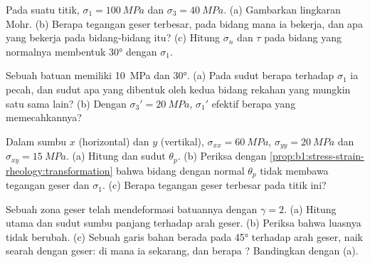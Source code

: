 \begin{exercise}[$\star$]\label{exo:b1:stress-strain-rheology:3}
Pada suatu titik, $\sigma_1 = \qty{100}{MPa}$ dan $\sigma_3 = \qty{40}{MPa}$. (a) Gambarkan lingkaran Mohr. (b) Berapa tegangan geser terbesar, pada bidang mana ia bekerja, dan  apa yang bekerja pada bidang-bidang itu? (c) Hitung $\sigma_n$ dan $\tau$ pada bidang yang normalnya membentuk \ang{30} dengan $\sigma_1$.
\end{exercise}

\begin{exercise}[$\star$]\label{exo:b1:stress-strain-rheology:4}
Sebuah batuan memiliki  \qty{10}{MPa} dan  \ang{30}. (a) Pada sudut berapa terhadap $\sigma_1$ ia pecah, dan sudut apa yang dibentuk oleh kedua bidang rekahan yang mungkin satu sama lain? (b) Dengan $\sigma_3' = \qty{20}{MPa}$, $\sigma_1'$ efektif berapa yang memecahkannya?
\end{exercise}

\begin{exercise}[$\star\star$]\label{exo:b1:stress-strain-rheology:5}
Dalam sumbu $x$ (horizontal) dan $y$ (vertikal), $\sigma_{xx} = \qty{60}{MPa}$, $\sigma_{yy} = \qty{20}{MPa}$ dan $\sigma_{xy} = \qty{15}{MPa}$. (a) Hitung  dan sudut $\theta_p$. (b) Periksa dengan \cref{prop:b1:stress-strain-rheology:transformation} bahwa bidang dengan normal $\theta_p$ tidak membawa tegangan geser dan  $\sigma_1$. (c) Berapa tegangan geser terbesar pada titik ini?
\end{exercise}

\begin{exercise}[$\star\star$]\label{exo:b1:stress-strain-rheology:6}
Sebuah zona geser telah mendeformasi batuannya dengan  $\gamma = 2$. (a) Hitung  utama dan sudut sumbu panjang  terhadap arah geser. (b) Periksa bahwa luasnya tidak berubah. (c) Sebuah garis bahan berada pada \ang{45} terhadap arah geser, naik searah dengan geser: di mana ia sekarang, dan berapa ? Bandingkan dengan (a).
\end{exercise}

